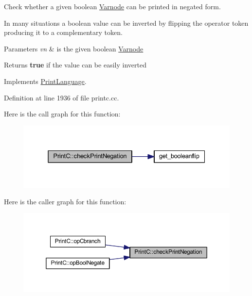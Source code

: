 Check whether a given boolean \mbox{\hyperlink{class_varnode}{Varnode}} can be printed in negated form. 

In many situations a boolean value can be inverted by flipping the operator token producing it to a complementary token. 
\begin{DoxyParams}{Parameters}
{\em vn} & is the given boolean \mbox{\hyperlink{class_varnode}{Varnode}} \\
\hline
\end{DoxyParams}
\begin{DoxyReturn}{Returns}
{\bfseries{true}} if the value can be easily inverted 
\end{DoxyReturn}


Implements \mbox{\hyperlink{class_print_language_a5ce2d6fc0fee85cdc030732d3825b154}{Print\+Language}}.



Definition at line 1936 of file printc.\+cc.

Here is the call graph for this function\+:
\nopagebreak
\begin{figure}[H]
\begin{center}
\leavevmode
\includegraphics[width=331pt]{class_print_c_ad1f1099f49b4169948682a34c5b9f9cb_cgraph}
\end{center}
\end{figure}
Here is the caller graph for this function\+:
\nopagebreak
\begin{figure}[H]
\begin{center}
\leavevmode
\includegraphics[width=350pt]{class_print_c_ad1f1099f49b4169948682a34c5b9f9cb_icgraph}
\end{center}
\end{figure}
\mbox{\label{class_print_c_a3ba75e33a923a30e5fe29b8201855749}} 
